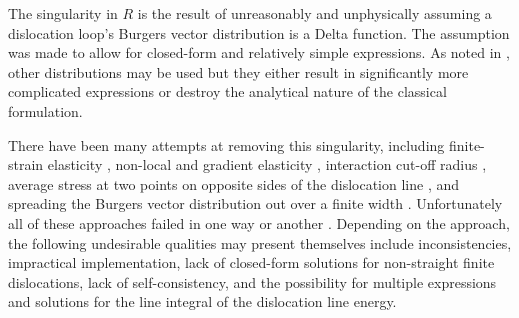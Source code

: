 The singularity in $ R $ is the result of unreasonably and unphysically assuming a dislocation loop's Burgers vector distribution is a Delta function. The assumption was made to allow for closed-form and relatively simple expressions. As noted in \cite{bv_dist}, other distributions may be used but they either result in significantly more complicated expressions or destroy the analytical nature of the classical formulation.

There have been many attempts at removing this singularity, including finite-strain elasticity \cite{non_sing3}, non-local and gradient elasticity \cite{non_sing1, non_sing2}, interaction cut-off radius \cite{pk_force}, average stress at two points on opposite sides of the dislocation line \cite{non_sing4, non_sing5}, and spreading the Burgers vector distribution out over a finite width \cite{bv_dist, non_sing6, non_sing7}. Unfortunately all of these approaches failed in one way or another \cite{a_non-singular_continuum_theory_of_dislocations}. Depending on the approach, the following undesirable qualities may present themselves include inconsistencies, impractical implementation, lack of closed-form solutions for non-straight finite dislocations, lack of self-consistency, and the possibility for multiple expressions and solutions for the line integral of the dislocation line energy.

